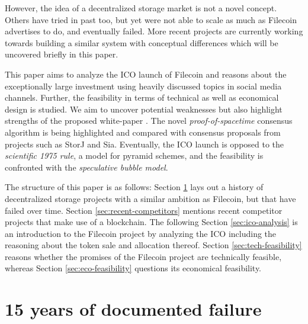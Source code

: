 \documentclass[conference]{IEEEtran}
\begin{document}
However, the idea of a decentralized storage market is not a novel concept.
Others\cite{tribler}\cite{mojo-nation} have tried in past too, but yet were not able to scale as much as Filecoin advertises to do, and eventually failed.
More recent projects\cite{storj}\cite{sia} are currently working towards building a similar system with conceptual differences which will be uncovered briefly in this paper.

This paper aims to analyze the ICO launch of Filecoin and reasons about the exceptionally large investment using heavily discussed topics in social media channels.
Further, the feasibility in terms of technical as well as economical design is studied.
We aim to uncover potential weaknesses but also highlight strengths of the proposed white-paper \cite{filecoin}.
The novel \textit{proof-of-spacetime} consensus algorithm is being highlighted and compared with consensus proposals from projects such as StorJ and Sia.
Eventually, the ICO launch is opposed to the \textit{scientific 1975 rule}, a model for pyramid schemes\cite{pyramid-scheme}, and the feasibility is confronted with the \textit{speculative bubble model}\cite{bubble}.

The structure of this paper is as follows: Section \ref{sec:documented-failure} lays out a history of decentralized storage projects with a similar ambition as Filecoin, but that have failed over time. 
Section \ref{sec:recent-competitors} mentions recent competitor projects that make use of a blockchain.
The following Section \ref{sec:ico-analysis} is an introduction to the Filecoin project by analyzing the ICO including the reasoning about the token sale and allocation thereof.
Section \ref{sec:tech-feasibility} reasons whether the promises of the Filecoin project are technically feasible, whereas Section \ref{sec:eco-feasibility} questions its economical feasibility.


\section{15 years of documented failure}
\label{sec:documented-failure}
\end{document}
